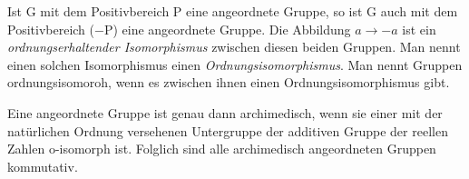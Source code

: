 %
\begin{defn}\label{ordnungsisomorph}
Ist G mit dem Positivbereich P eine angeordnete Gruppe,
so ist G auch mit dem Positivbereich (−P) eine angeordnete Gruppe. Die Abbildung
$a \rightarrow −a$ ist ein \textit{ordnungserhaltender Isomorphismus} zwischen diesen
beiden Gruppen. Man nennt einen solchen Isomorphismus einen \textit{Ordnungsisomorphismus}.
Man nennt Gruppen ordnungsisomoroh, wenn es zwischen ihnen einen Ordnungsisomorphismus gibt.
\end{defn}
%
\begin{satz}\label{aga} 
Eine angeordnete Gruppe ist genau dann archimedisch, wenn sie einer mit der natürlichen Ordnung versehenen Untergruppe der additiven Gruppe der reellen Zahlen o-isomorph ist. 
Folglich sind alle archimedisch angeordneten Gruppen kommutativ.   \cite{hoelder1901}
\end{satz}
%
%
